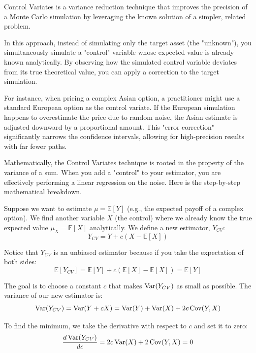 Control Variates is a variance reduction technique that improves the precision of a Monte Carlo simulation by leveraging the known solution of a simpler, related problem.

In this approach, instead of simulating only the target asset (the "unknown"), you simultaneously simulate a "control" variable whose expected value is already known analytically. 
By observing how the simulated control variable deviates from its true theoretical value, you can apply a correction to the target simulation.

For instance, when pricing a complex Asian option, a practitioner might use a standard European option as the control variate. If the European simulation happens to overestimate the 
price due to random noise, the Asian estimate is adjusted downward by a proportional amount. This "error correction" significantly narrows the confidence intervals, allowing for 
high-precision results with far fewer paths.

Mathematically, the Control Variates technique is rooted in the property of the variance of a sum. When you add a "control" to your estimator, you are effectively performing a linear regression on the noise.
Here is the step-by-step mathematical breakdown. 

Suppose we want to estimate $\mu =\mathbb{E}[Y]$ (e.g., the expected payoff of a complex option). We find another variable $X$ (the control) where we already know the true expected value
$\mu_X=\mathbb{E}[X]$ analytically. We define a new estimator, $Y_{CV}$: 
\begin{equation}
Y_{CV}=Y+c(X-\mathbb{E}[X])
\end{equation}

Notice that $Y_{CV}$ is an unbiased estimator because if you take the expectation of both sides: 
\begin{equation}
\mathbb{E}[Y_{CV}]=\mathbb{E}[Y]+c(\mathbb{E}[X]-\mathbb{E}[X])=\mathbb{E}[Y]
\end{equation}

The goal is to choose a constant $c$ that makes $\operatorname{Var}(Y_{CV})$ as small as possible. The variance of our new estimator is:
\begin{equation}
\operatorname{Var}(Y_{CV})=\operatorname{Var}(Y+cX)=\operatorname{Var}(Y)+\operatorname{Var}(X)+2c\operatorname{Cov}(Y,X)
\end{equation}

To find the minimum, we take the derivative with respect to $c$ and set it to zero: 
\begin{equation}
\frac{d\operatorname{Var}(Y_{CV})}{dc} = 2c\operatorname{Var}(X)+2\operatorname{Cov}(Y,X)=0
\end{equation}

